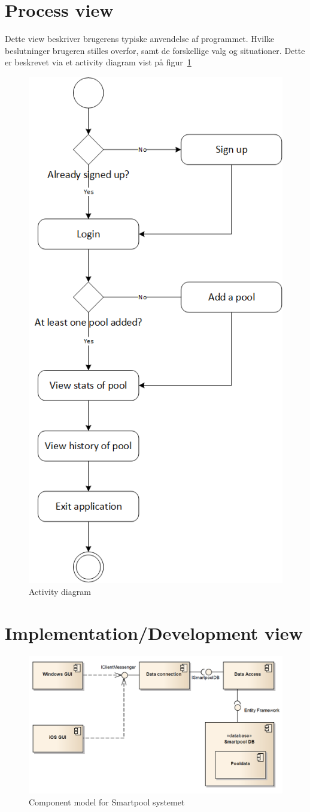 \section{Process view}
Dette view beskriver brugerens typiske anvendelse af programmet. Hvilke beslutninger brugeren stilles overfor, samt de forskellige valg og situationer. Dette er beskrevet via et activity diagram vist på figur~\ref{fig:ActivityDiagram}

\begin{figure}
\centering
\includegraphics[width=0.55\linewidth]{figs/arkitektur/ActivityDiagram.PNG}
\caption{Activity diagram}
\label{fig:ActivityDiagram}
\end{figure}


\section{Implementation/Development view}

\begin{figure}
\centering
\includegraphics[width=0.7\linewidth]{figs/arkitektur/componentModel}
\caption{Component model for Smartpool systemet}
\label{fig:componentModel}
\end{figure}

